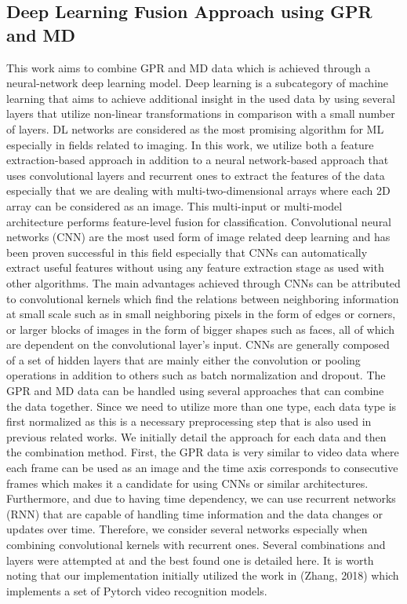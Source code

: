\documentclass{ieeeaccess}
\begin{document}
\subsection{Deep Learning Fusion Approach using GPR and MD}
This work aims to combine GPR and MD data which is achieved through a neural-network deep learning model. Deep learning is a subcategory of machine learning that aims to achieve additional insight in the used data by using several layers that utilize non-linear transformations in comparison with a small number of layers. DL networks are considered as the most promising algorithm for ML especially in fields related to imaging. In this work, we utilize both a feature extraction-based approach in addition to a neural network-based approach that uses convolutional layers and recurrent ones to extract the features of the data especially that we are dealing with multi-two-dimensional arrays where each 2D array can be considered as an image. This multi-input or multi-model architecture performs feature-level fusion for classification.
Convolutional neural networks (CNN) are the most used form of image related deep learning and has been proven successful in this field especially that CNNs can automatically extract useful features without using any feature extraction stage as used with other algorithms. The main advantages achieved through CNNs can be attributed to convolutional kernels which find the relations between neighboring information at small scale such as in small neighboring pixels in the form of edges or corners, or larger blocks of images in the form of bigger shapes such as faces, all of which are dependent on the convolutional layer's input. CNNs are generally composed of a set of hidden layers that are mainly either the convolution or pooling operations in addition to others such as batch normalization and dropout.
The GPR and MD data can be handled using several approaches that can combine the data together. Since we need to utilize more than one type, each data type is first normalized as this is a necessary preprocessing step that is also used in previous related works. We initially detail the approach for each data and then the combination method.
First, the GPR data is very similar to video data where each frame can be used as an image and the time axis corresponds to consecutive frames which makes it a candidate for using CNNs or similar architectures. Furthermore, and due to having time dependency, we can use recurrent networks (RNN) that are capable of handling time information and the data changes or updates over time. Therefore, we consider several networks especially when combining convolutional kernels with recurrent ones. Several combinations and layers were attempted at and the best found one is detailed here. It is worth noting that our implementation initially utilized the work in (Zhang, 2018) which implements a set of Pytorch video recognition models.
\end{document}
